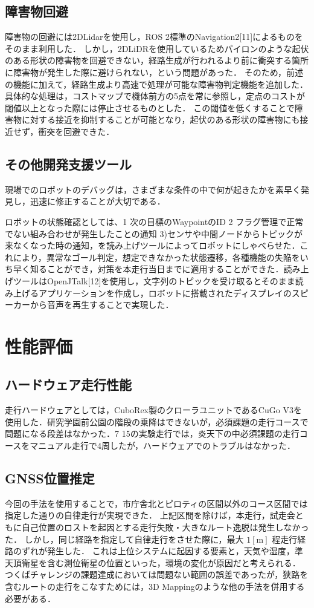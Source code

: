 \documentclass[platex,dvipdfmx]{rbproceedings}
\begin{document}
\subsection{障害物回避}
障害物の回避には2DLidarを使用し，ROS 2標準のNavigation2[11]によるものをそのまま利用した．
しかし，2DLiDRを使用しているためパイロンのような起伏のある形状の障害物を回避できない，経路生成が行われるより前に衝突する箇所に障害物が発生した際に避けられない，という問題があった．
そのため，前述の機能に加えて，経路生成より高速で処理が可能な障害物判定機能を追加した．
具体的な処理は，コストマップで機体前方の5点を常に参照し，定点のコストが閾値以上となった際には停止させるものとした．
この閾値を低くすることで障害物に対する接近を抑制することが可能となり，起伏のある形状の障害物にも接近せず，衝突を回避できた．

\subsection{その他開発支援ツール}
現場でのロボットのデバッグは，さまざまな条件の中で何が起きたかを素早く発見し，迅速に修正することが大切である．

ロボットの状態確認としては、1  次の目標のWaypointのID 2  フラグ管理で正常でない組み合わせが発生したことの通知 3)センサや中間ノードからトピックが来なくなった時の通知，を読み上げツールによってロボットにしゃべらせた．これにより，異常なゴール判定，想定できなかった状態遷移，各種機能の失陥をいち早く知ることができ，対策を本走行当日までに適用することができた．読み上げツールはOpenJTalk[12]を使用し，文字列のトピックを受け取るとそのまま読み上げるアプリケーションを作成し，ロボットに搭載されたディスプレイのスピーカーから音声を再生することで実現した．

\section{性能評価}
\subsection{ハードウェア走行性能}
走行ハードウェアとしては，CuboRex製のクローラユニットであるCuGo V3を使用した．研究学園前公園の階段の乗降はできないが，必須課題の走行コースで問題になる段差はなかった．7 15の実験走行では，炎天下の中必須課題の走行コースをマニュアル走行で4周したが，ハードウェアでのトラブルはなかった．

\subsection{GNSS位置推定}
今回の手法を使用することで，市庁舎北とピロティの区間以外のコース区間では指定した通りの自律走行が実現できた．
上記区間を除けば，本走行，試走会ともに自己位置のロストを起因とする走行失敗・大きなルート逸脱は発生しなかった．
しかし，同じ経路を指定して自律走行をさせた際に，最大 $1[\mathrm{m}]$ 程走行経路のずれが発生した．
これは上位システムに起因する要素と，天気や湿度，準天頂衛星を含む測位衛星の位置といった，環境の変化が原因だと考えられる．
つくばチャレンジの課題達成においては問題ない範囲の誤差であったが，狭路を含むルートの走行をこなすためには，3D Mappingのような他の手法を併用する必要がある．
\end{document}
